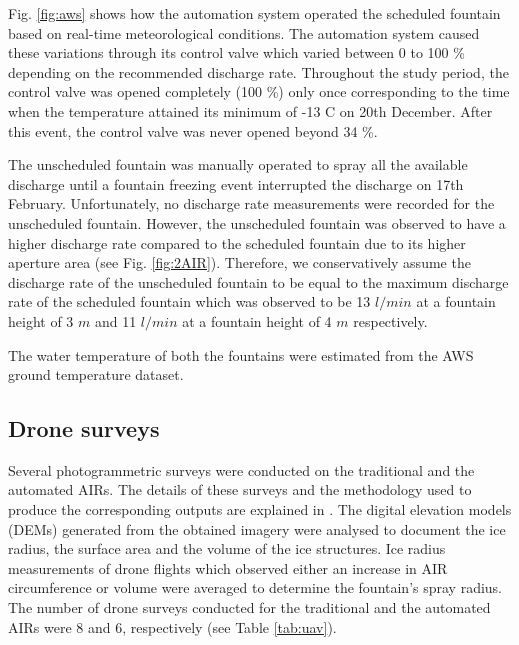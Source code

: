 \documentclass[tc, manuscript]{copernicus}
\begin{document}
Fig. \ref{fig:aws} shows how the automation system operated the scheduled fountain based on real-time
meteorological conditions. The automation system caused these variations through its control valve which varied
between 0 to 100 \% depending on the recommended discharge rate. Throughout the study period, the control valve
was opened completely (100 \%) only once corresponding to the time when the temperature attained its minimum of
-13 \degree C on 20th December. After this event, the control valve was never opened beyond 34 \%.  

The unscheduled fountain was manually operated to spray all the available discharge until a fountain freezing
event interrupted the discharge on 17th February. Unfortunately, no discharge rate measurements were recorded
for the unscheduled fountain. However, the unscheduled fountain was observed to have a higher discharge rate
compared to the scheduled fountain due to its higher aperture area (see Fig. \ref{fig:2AIR}). Therefore, we
conservatively assume the discharge rate of the unscheduled fountain to be equal to the maximum discharge rate
of the scheduled fountain which was observed to be 13 $l/min$ at a fountain height of 3 $m$ and 11 $l/min$ at a
fountain height of 4 $m$ respectively.

The water temperature of both the fountains were estimated from the AWS ground temperature dataset.

\subsection{Drone surveys}

Several photogrammetric surveys were conducted on the traditional and the automated AIRs. The details of these
surveys and the methodology used to produce the corresponding outputs are explained in
\cite{balasubramanianInfluenceMeteorologicalConditions2022}. The digital elevation models (DEMs) generated from
the obtained imagery were analysed to document the ice radius, the surface area and the volume of the ice
structures. Ice radius measurements of drone flights which observed either an increase in AIR circumference or
volume were averaged to determine the fountain's spray radius. The number of drone surveys conducted for the
traditional and the automated AIRs were 8 and 6, respectively (see Table \ref{tab:uav}). 
\end{document}

